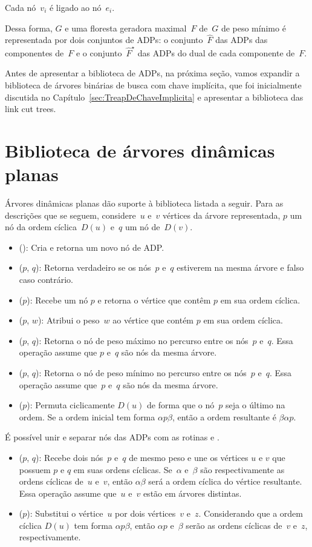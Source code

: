 Cada nó~$v_i$ é ligado ao nó~$e_i$.

Dessa forma, $G$ e uma floresta geradora maximal~$F$ de~$G$ de peso mínimo é representada por dois conjuntos de ADPs: o conjunto~$\hat F$ das ADPs das componentes de~$F$ e o conjunto~$\hat F^\star$ das ADPs do dual de cada componente de~$F$.

Antes de apresentar a biblioteca de ADPs, na próxima seção, vamos expandir a biblioteca de árvores binárias de busca com chave implícita, que foi inicialmente discutida no Capítulo~\ref{sec:TreapDeChaveImplicita} e apresentar a biblioteca das link cut trees.


\section{Biblioteca de árvores dinâmicas planas}
\label{sec:EODT}

Árvores dinâmicas planas dão suporte à biblioteca listada a seguir.
Para as descrições que se seguem, considere~$u$ e~$v$ vértices da árvore representada,
$p$ um nó da ordem cíclica~$D(u)$ e~$q$ um nó de~$D(v)$.

\begin{itemize}
\item \LCOMakeNode(): Cria e retorna um novo nó de ADP.
\item \LCOConnected($p$, $q$): Retorna verdadeiro se os nós~$p$ e~$q$ estiverem na mesma árvore e falso caso contrário.
\item \LCOFindNode($p$): Recebe um nó $p$ e retorna o vértice que contêm $p$ em sua ordem cíclica.
\item \LCOAddCost($p$, $w$): Atribui o peso~$w$ ao vértice que contém $p$ em sua ordem cíclica.
\item \LCOMax($p$, $q$): Retorna o nó de peso máximo no percurso entre os nós~$p$ e~$q$.
Essa operação assume que $p$ e~$q$ são nós da mesma árvore.
\item \LCOMin($p$, $q$): Retorna o nó de peso mínimo no percurso entre os nós~$p$ e~$q$.
Essa operação assume que~$p$ e~$q$ são nós da mesma árvore.
\item \LCOCycle($p$): Permuta ciclicamente $D(u)$ de forma que o nó~$p$ seja o último na ordem.
Se a ordem inicial tem forma $\alpha p \beta$, então a ordem resultante é $\beta\alpha p$.
\end{itemize}

É possível unir e separar nós das ADPs com as rotinas \LCOMerge{} e \LCOSplit{}.

\begin{itemize}
\item \LCOMerge($p$, $q$): Recebe dois nós~$p$ e~$q$ de mesmo peso e une os vértices $u$ e $v$ que possuem $p$ e $q$ em suas ordens cíclicas.
Se~$\alpha$ e~$\beta$ são respectivamente as ordens cíclicas de~$u$ e~$v$, então $\alpha\beta$ será a ordem cíclica do vértice resultante. 
Essa operação assume que~$u$ e~$v$ estão em árvores distintas.
\item \LCOSplit($p$): Substitui o vértice~$u$ por dois vértices~$v$ e~$z$.
Considerando que a ordem cíclica $D(u)$ tem forma $\alpha p\beta$, então $\alpha p$ e~$\beta$ serão as ordens cíclicas de~$v$ e~$z$, respectivamente.
\end{itemize}


